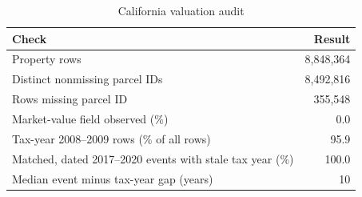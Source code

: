 \begin{table}[!ht]\centering
\caption{California valuation audit}\label{tab:welfare_data}
{\small\begin{tabular}{lr}\toprule Check & Result \\
\midrule
Property rows & 8,848,364 \\
Distinct nonmissing parcel IDs & 8,492,816 \\
Rows missing parcel ID & 355,548 \\
Market-value field observed (\%) & 0.0 \\
Tax-year 2008--2009 rows (\% of all rows) & 95.9 \\
Matched, dated 2017--2020 events with stale tax year (\%) & 100.0 \\
Median event minus tax-year gap (years) & 10 \\
\bottomrule\end{tabular}}
\begin{minipage}{0.95\textwidth}\end{minipage}\end{table}
